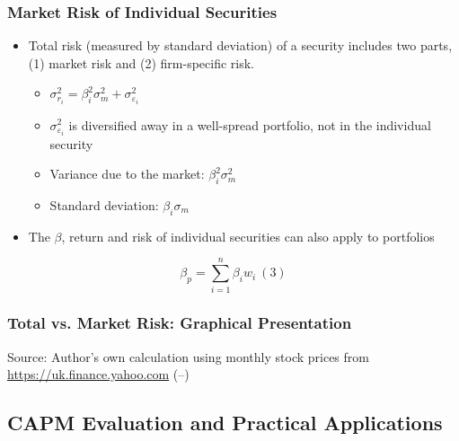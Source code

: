 \documentclass[9pt,aspectratio=169]{beamer}
\begin{document}
\begin{frame}

\frametitle{\textnormal{Market Risk of Individual Securities}}

\begin{itemize}
    \item Total risk (measured by standard deviation) of a security includes two parts, (1) market risk and (2) firm-specific risk.
 
 \begin{itemize}
 \item [-] $\sigma_{r_i}^2 = \beta_i^2 \sigma_m^2 + \sigma_{\varepsilon_i}^2$
\item [-] $\sigma_{\varepsilon_i}^2$ is diversified away in a well-spread portfolio, not in the individual security
 \item [-] Variance due to the market: $\beta_i^2 \sigma_m^2$
 \item [-] Standard deviation: $\beta_i \sigma_m$
 \end{itemize}

 \item The $\beta$, return and risk of individual securities can also apply to portfolios


\end{itemize}

$$\beta_p = \sum_{i=1}^n \beta_i w_i \ (3)$$

\end{frame}


\begin{frame}

\frametitle{\textnormal{Total vs. Market Risk: Graphical Presentation}}

\begin{center}
    

    \tiny {Source: Author’s own calculation using monthly stock prices from \url{https://uk.finance.yahoo.com} (\LWindowFrom--\LWindowTo)
}

\end{center}
\end{frame}

\subsection{CAPM Evaluation and Practical Applications}
\end{document}
